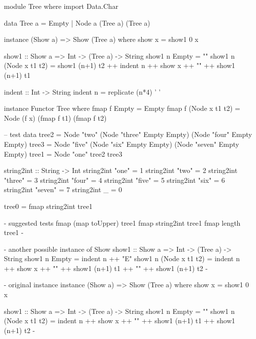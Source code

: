 ﻿module Tree where
import Data.Char

data Tree a = Empty | Node a (Tree a) (Tree a)

instance (Show a) => Show (Tree a) where
  show x = show1 0 x

show1 :: Show a => Int -> (Tree a) -> String
show1 n Empty = ""
show1 n (Node x t1 t2) =
  show1 (n+1) t2 ++
  indent n ++ show x ++ "\n" ++
  show1 (n+1) t1

indent :: Int -> String
indent n = replicate (n*4) ' '

instance Functor Tree where
  fmap f Empty = Empty
  fmap f (Node x t1 t2) =
    Node (f x) (fmap f t1) (fmap f t2)

-- test data
tree2 = Node "two" (Node "three" Empty Empty) 
                   (Node "four" Empty Empty)
tree3 = Node "five" (Node "six" Empty Empty)
                    (Node "seven" Empty Empty)
tree1 = Node "one" tree2 tree3

string2int :: String -> Int
string2int "one"   = 1
string2int "two"   = 2
string2int "three" = 3
string2int "four"  = 4
string2int "five"  = 5
string2int "six"   = 6
string2int "seven" = 7
string2int _       = 0

tree0 = fmap string2int tree1

{- suggested tests
fmap (map toUpper) tree1
fmap string2int tree1
fmap length tree1
-}

{- another possible instance of Show
show1 :: Show a => Int -> (Tree a) -> String
show1 n Empty = indent n ++ "E"
show1 n (Node x t1 t2) =
  indent n ++ show x ++ "\n" ++
  show1 (n+1) t1 ++ "\n" ++
  show1 (n+1) t2
-}

{- original instance
instance (Show a) => Show (Tree a) where
  show x = show1 0 x

show1 :: Show a => Int -> (Tree a) -> String
show1 n Empty = ""
show1 n (Node x t1 t2) =
  indent n ++ show x ++ "\n" ++
  show1 (n+1) t1 ++
  show1 (n+1) t2
-}